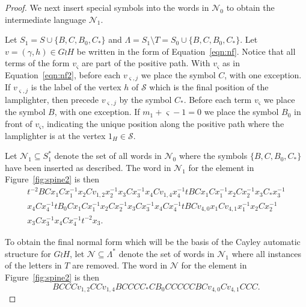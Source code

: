 \documentclass[11pt]{amsart}
\newcommand{\cC}{\varsigma}
\theoremstyle{definition}
\begin{document}
\begin{proof}
We next insert special symbols into the words in $\mathcal N_0$ to obtain the intermediate language $\mathcal N_1$.

Let
$S_1=S\cup\{B,C, B_0,C_*\}$ and
$\Lambda=S_1\setminus T=S_0\cup\{B,C, B_0,C_*\}$.
Let $v = (\gamma,h) \in G \wr H$ be written in the form of Equation~\eqref{eqn:nf}.
Notice that all terms of the form $v_\cC$ are part of the positive path.
With $v_\cC$ as in Equation~\eqref{eqn:nf2}, before each $v_{\cC,j}$ we place the symbol $C$, with one exception.
If $v_{\cC,j}$ is the label of the vertex $h$ of {${\mathcal S}$} which is the final position of the lamplighter, then precede $v_{\cC,j}$ by the symbol $C_*$.
Before each term $v_\cC$ we place the symbol $B$, with one exception.
If $m_1+\cC-1 = 0$ we place the symbol $B_0$ in front of $v_{\cC}$, indicating the unique position along the positive path where the lamplighter is at  the vertex $1_H \in {\mathcal S}$.

Let ${\mathcal N}_1\subseteq S_1^*$ denote the set of all
words in ${\mathcal N_0}$ where the symbols $\{B,C, B_0,C_*\}$ have been inserted as described.
The word  in $\mathcal N_1$ for
the element in
 Figure~\ref{fig:spine2}
is then
\begin{equation*}
  \begin{split}
t^{-2}BCx_1Cx_1^{-1}x_2Cv_{1,2}x_2^{-1}x_3Cx_3^{-1}x_4Cv_{1,4}x_4^{-1}
 tBCx_1Cx_1^{-1}x_2Cx_2^{-1}x_3C_*x_3^{-1} \\
 x_4Cx_4^{-1} tB_0Cx_1Cx_1^{-1}x_2Cx_2^{-1}x_3Cx_3^{-1}x_4Cx_4^{-1}
  tBCv_{4,0}x_1Cv_{4,1}x_1^{-1}x_2Cx_2^{-1} \\ x_3Cx_3^{-1}
  x_4Cx_4^{-1}
 t^{-2}x_3.
   \end{split}
   \end{equation*}






To obtain the final normal form which will be the basis of the Cayley automatic structure for $G \wr H$, let ${\mathcal N}\subseteq \Lambda^*$ denote the set of words in ${\mathcal N}_1$ where all instances of the letters in $T$ are removed.
The word in $\mathcal N$ for
the element in
 Figure~\ref{fig:spine2}
is then
    \begin{dmath*}
BCCCv_{1,2}CCv_{1,4}BCCCC_*C
 B_0CCCCC
  BCv_{4,0}Cv_{4,1}CCC.
   \end{dmath*}




\end{proof}
\end{document}
